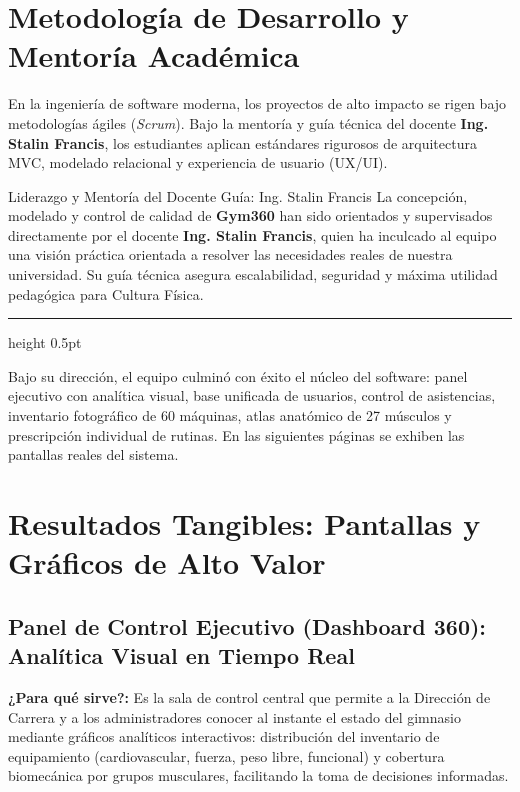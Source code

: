 \documentclass[11pt,a4paper]{article}
\begin{document}
\vspace{1.5mm}

\section{Metodología de Desarrollo y Mentoría Académica}

En la ingeniería de software moderna, los proyectos de alto impacto se rigen bajo metodologías ágiles (\textit{Scrum}). Bajo la mentoría y guía técnica del docente \textbf{Ing. Stalin Francis}, los estudiantes aplican estándares rigurosos de arquitectura MVC, modelado relacional y experiencia de usuario (UX/UI). 

\vspace{1mm}

\begin{mentorbox}{Liderazgo y Mentoría del Docente Guía: Ing. Stalin Francis}
La concepción, modelado y control de calidad de \textbf{Gym360} han sido orientados y supervisados directamente por el docente \textbf{Ing. Stalin Francis}, quien ha inculcado al equipo una visión práctica orientada a resolver las necesidades reales de nuestra universidad. Su guía técnica asegura escalabilidad, seguridad y máxima utilidad pedagógica para Cultura Física.

\vspace{1.2mm}
{\color{BorderGray}\hrule height 0.5pt}\vspace{1.2mm}
\textbf{\color{AccentGreen}{Hito Alcanzado $\checkmark$ Primer Sprint Operativo al 100\%:}}
Bajo su dirección, el equipo culminó con éxito el núcleo del software: panel ejecutivo con analítica visual, base unificada de usuarios, control de asistencias, inventario fotográfico de 60 máquinas, atlas anatómico de 27 músculos y prescripción individual de rutinas. En las siguientes páginas se exhiben las pantallas reales del sistema.
\end{mentorbox}

\newpage

\section{Resultados Tangibles: Pantallas y Gráficos de Alto Valor}

\subsection{Panel de Control Ejecutivo (Dashboard 360): Analítica Visual en Tiempo Real}
\textbf{¿Para qué sirve?:} Es la sala de control central que permite a la Dirección de Carrera y a los administradores conocer al instante el estado del gimnasio mediante gráficos analíticos interactivos: distribución del inventario de equipamiento (cardiovascular, fuerza, peso libre, funcional) y cobertura biomecánica por grupos musculares, facilitando la toma de decisiones informadas.
\end{document}
